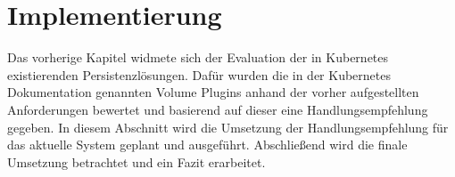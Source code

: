 
\chapter{Implementierung}
\label{cha:implementierung}
Das vorherige Kapitel widmete sich der Evaluation der in Kubernetes existierenden Persistenzlösungen. Dafür wurden die in der Kubernetes Dokumentation genannten Volume Plugins anhand der vorher aufgestellten Anforderungen bewertet und basierend auf dieser eine Handlungsempfehlung gegeben. In diesem Abschnitt wird die Umsetzung der Handlungsempfehlung für das aktuelle System geplant und ausgeführt. Abschließend wird die finale Umsetzung betrachtet und ein Fazit erarbeitet.

